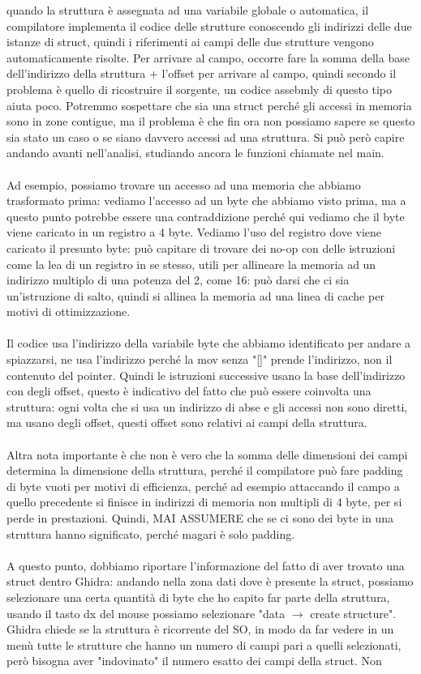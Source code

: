 \documentclass[12pt, oneside]{extbook}
\begin{document}
quando la struttura è assegnata ad una variabile globale o automatica, il compilatore implementa il codice delle strutture conoscendo gli indirizzi delle due istanze di struct, quindi i riferimenti ai campi delle due strutture vengono automaticamente risolte. Per arrivare al campo, occorre fare la somma della base dell'indirizzo della struttura + l'offset per arrivare al campo, quindi secondo il problema è quello di ricostruire il sorgente, un codice assebmly di questo tipo aiuta poco. Potremmo sospettare che sia una struct perché gli accessi in memoria sono in zone contigue, ma il problema è che fin ora non possiamo sapere se questo sia stato un caso o se siano davvero accessi ad una struttura. Si può però capire andando avanti nell'analisi, studiando ancora le funzioni chiamate nel main. \\\\ Ad esempio, possiamo trovare un accesso ad una memoria che abbiamo trasformato prima: vediamo l'accesso ad un byte che abbiamo visto prima, ma a questo punto potrebbe essere una contraddizione perché qui vediamo che il byte viene caricato in un registro a 4 byte. Vediamo l'uso del registro dove viene caricato il presunto byte: può capitare di trovare dei no-op con delle istruzioni come la lea di un registro in se stesso, utili per allineare la memoria ad un indirizzo multiplo di una potenza del 2, come 16: può darsi che ci sia un'istruzione di salto, quindi si allinea la memoria ad una linea di cache per motivi di ottimizzazione.\\\\ Il codice usa l'indirizzo della variabile byte che abbiamo identificato per andare a spiazzarsi, ne usa l'indirizzo perché la mov senza "[]" prende l'indirizzo, non il contenuto del pointer. Quindi le istruzioni successive usano la base dell'indirizzo con degli offset, questo è indicativo del fatto che può essere coinvolta una struttura: ogni volta che si usa un indirizzo di abse e gli accessi non sono diretti, ma usano degli offset, questi offset sono relativi ai campi della struttura.\\\\ Altra nota importante è che non è vero che la somma delle dimensioni dei campi determina la dimensione della struttura, perché il compilatore può fare padding di byte vuoti per motivi di efficienza, perché ad esempio attaccando il campo a quello precedente si finisce in indirizzi di memoria non multipli di 4 byte, per si perde in prestazioni. Quindi, MAI ASSUMERE che se ci sono dei byte in una struttura hanno significato, perché magari è solo padding.\\\\ A questo punto, dobbiamo riportare l'informazione del fatto di aver trovato una struct dentro Ghidra: andando nella zona dati dove è presente la struct, possiamo selezionare una certa quantità di byte che ho capito far parte della struttura, usando il tasto dx del mouse possiamo selezionare "data $\rightarrow$ create structure". Ghidra chiede se la struttura è ricorrente del SO, in modo da far vedere in un menù tutte le strutture che hanno un numero di campi pari a quelli selezionati, però bisogna aver "indovinato" il numero esatto dei campi della struct. Non 
\end{document}

